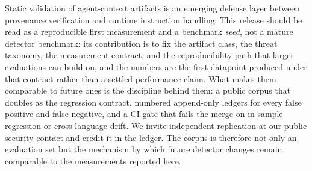 Static validation of agent-context artifacts is an emerging defense
layer between provenance verification and runtime instruction handling.
This release should be read as a reproducible first measurement and a
benchmark \emph{seed}, not a mature detector benchmark: its contribution
is to fix the artifact class, the threat taxonomy, the measurement
contract, and the reproducibility path that larger evaluations can build
on, and the numbers are the first datapoint produced under that contract
rather than a settled performance claim. What makes them comparable to
future ones is the discipline behind them: a public corpus that doubles
as the regression contract, numbered append-only ledgers for every
false positive and false negative, and a CI gate that fails the merge on
in-sample regression or cross-language drift. We invite independent
replication at our public security contact and credit it in the ledger.
The corpus is therefore not only an evaluation set but the mechanism by
which future detector changes remain comparable to the measurements
reported here.
